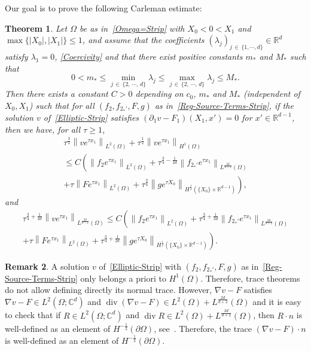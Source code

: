 \documentclass[10pt]{amsart}
\newtheorem{theo}{Theorem}[section]
\theoremstyle{definition}\newtheorem{defi}[theo]{Definition}\newtheorem{rema}[theo]{Remark}\newtheorem{exam}[theo]{Example}\newtheorem{exem}[theo]{Example}\newtheorem{nota}[theo]{Notation}
\newcommand*\R{\mathbb{R}}
\newcommand*\C{\mathbb{C}}
\renewcommand{\leq}{\leqslant}
\renewcommand{\geq}{\geqslant}
\renewcommand{\div}{\operatorname{div}}
\begin{document}
Our goal is to prove the following Carleman estimate:
\begin{theo}\label{Thm-Carleman-Strip}
Let $\Omega$ be as in~\eqref{Omega=Strip} with $X_0 \! <\! 0\! <\! X_1$ and $\max\{|X_0|, |X_1|\} \leq 1$, and assume that the coefficients $(\lambda_j)_{j\,\in\,\{1,\cdots,d\}} \in \R^d$ satisfy $\lambda_1 = 0$, \eqref{Coercivity} and that there exist positive constants $m_*$ and $M_*$ such that
\begin{equation}\label{Sub-ellipticity-Strip}
0< m_*\leq \min_{j\,\in\,\{2,\, \cdots,\, d\}} \lambda_j
\leq \max_{j\,\in\,\{2,\, \cdots,\, d\}} \lambda_j \leq M_*.
\end{equation}
Then there exists a constant $C>0$ depending on $c_0$, $m_*$ and $M_*$ (independent of $X_0, X_1$) such that for all $(f_2, f_{2_*'},F,g)$ as in~\eqref{Reg-Source-Terms-Strip}, if the solution $v$ of~\eqref{Elliptic-Strip} satisfies $(\partial_1 v-F_1) (X_1, x') = 0$ for $x' \in \R^{d-1}$, then we have, for all $\tau \geq 1$,
\begin{multline}\label{Carleman-Strip-1}
\tau^{\frac{3}{2}} \left\| v e^{ \tau x_1}\right\|_{L^2(\Omega)} +
\tau^{\frac{1}{2}} \left\| v e^{\tau x_1} \right\|_{H^1(\Omega)}\\
\leq C\left(
\left\| f_2 e^{\tau x_1} \right\|_{L^2(\Omega)} +
\tau^{\frac{3}{4}-\frac{1}{2d}} \left\| f_{2_*'} e^{\tau x_1} \right\|_{L^{\frac{2d}{d+2}}(\Omega)}
\right.
\\
\left. +
\tau \left\| F e^{\tau x_1} \right\|_{L^2(\Omega)} +
\tau^{\frac{3}{4}} \left\| g e^{\tau X_0} \right\|_{H^{\frac{1}{2}}\left(\{X_0\} \times \R^{d-1}\right)}
\right),
\end{multline}
and
\begin{multline}\label{Carleman-Strip-2}
\tau^{\frac{3}{4}+\frac{1}{2d}} \left\| v e^{\tau x_1}\right\|_{L^{\frac{2d}{d-2}}(\Omega)}
\leq C\left(
\left\| f_2 e^{\tau x_1} \right\|_{L^2(\Omega)} +
\tau^{\frac{3}{4}+\frac{1}{2d}} \left\| f_{2_*'} e^{\tau x_1} \right\|_{L^{\frac{2d}{d+2}}(\Omega)}
\right.
\\
\left. +
\tau \left\| F e^{\tau x_1} \right\|_{L^2(\Omega)} +
\tau^{\frac{3}{4}+\frac{1}{2d}} \left\| g e^{\tau X_0} \right\|_{H^{\frac{1}{2}}\left(\{X_0\} \times \R^{d-1}\right)}
\right).
\end{multline}
\end{theo}

\begin{rema}
A solution $v$ of~\eqref{Elliptic-Strip} with $(f_2, f_{2_*'},F,g)$ as in~\eqref{Reg-Source-Terms-Strip} only belongs a priori to $H^1(\Omega)$. Therefore, trace theorems do not allow defining directly its normal trace. However, $\nabla v - F$ satisfies $\nabla v - F \in L^2(\Omega; \C^d)$ and $\div (\nabla v - F) \in L^2(\Omega) + L^{\frac{2d}{d+2}}(\Omega)$ and it is easy to check that if $R \in L^2(\Omega; \C^d)$ and $\div R \in L^2(\Omega) + L^{\frac{2d}{d+2}}(\Omega)$, then $R \cdot n$ is well-defined as an element of $H^{-\frac{1}{2}}(\partial \Omega)$, see~\cite[Theorem~III.2.43]{Boyer-Fabrie-Book}. Therefore, the trace $(\nabla v - F)\cdot n$ is well-defined as an element of $H^{-\frac{1}{2}}(\partial \Omega)$.
\end{rema}
\end{document}
